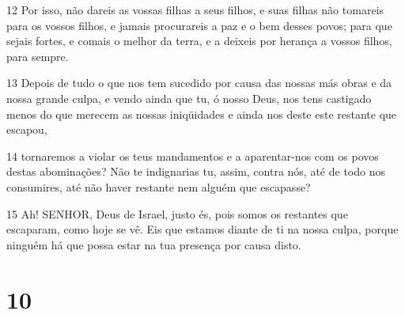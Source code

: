 \par 12 Por isso, não dareis as vossas filhas a seus filhos, e suas filhas não tomareis para os vossos filhos, e jamais procurareis a paz e o bem desses povos; para que sejais fortes, e comais o melhor da terra, e a deixeis por herança a vossos filhos, para sempre.
\par 13 Depois de tudo o que nos tem sucedido por causa das nossas más obras e da nossa grande culpa, e vendo ainda que tu, ó nosso Deus, nos tens castigado menos do que merecem as nossas iniqüidades e ainda nos deste este restante que escapou,
\par 14 tornaremos a violar os teus mandamentos e a aparentar-nos com os povos destas abominações? Não te indignarias tu, assim, contra nós, até de todo nos consumires, até não haver restante nem alguém que escapasse?
\par 15 Ah! SENHOR, Deus de Israel, justo és, pois somos os restantes que escaparam, como hoje se vê. Eis que estamos diante de ti na nossa culpa, porque ninguém há que possa estar na tua presença por causa disto.

\chapter{10}

